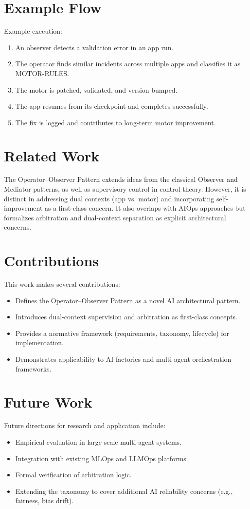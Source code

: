 \documentclass[11pt,a4paper]{article}
\begin{document}
\section{Example Flow}
Example execution:
\begin{enumerate}
    \item An observer detects a validation error in an app run.
    \item The operator finds similar incidents across multiple apps and classifies it as MOTOR-RULES.
    \item The motor is patched, validated, and version bumped.
    \item The app resumes from its checkpoint and completes successfully.
    \item The fix is logged and contributes to long-term motor improvement.
\end{enumerate}

\section{Related Work}
The Operator--Observer Pattern extends ideas from the classical Observer and Mediator patterns, as well as supervisory control in control theory. However, it is distinct in addressing dual contexts (app vs. motor) and incorporating self-improvement as a first-class concern. It also overlaps with AIOps approaches but formalizes arbitration and dual-context separation as explicit architectural concerns.

\section{Contributions}
This work makes several contributions:
\begin{itemize}
    \item Defines the Operator--Observer Pattern as a novel AI architectural pattern.
    \item Introduces dual-context supervision and arbitration as first-class concepts.
    \item Provides a normative framework (requirements, taxonomy, lifecycle) for implementation.
    \item Demonstrates applicability to AI factories and multi-agent orchestration frameworks.
\end{itemize}

\section{Future Work}
Future directions for research and application include:
\begin{itemize}
    \item Empirical evaluation in large-scale multi-agent systems.
    \item Integration with existing MLOps and LLMOps platforms.
    \item Formal verification of arbitration logic.
    \item Extending the taxonomy to cover additional AI reliability concerns (e.g., fairness, bias drift).
\end{itemize}
\end{document}
